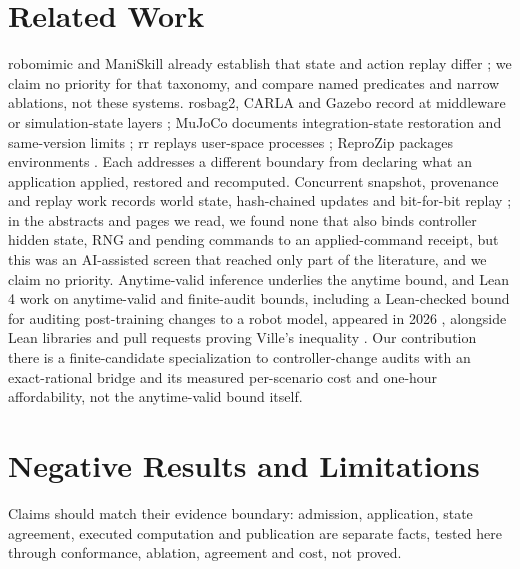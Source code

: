 \documentclass[letterpaper]{article}
\begin{document}
\section{Related Work}
robomimic and ManiSkill already establish that state and action replay differ \citep{robomimicplayback,maniskillreplay,
mandlekar2022robomimic,tao2025maniskill3,geng2025roboverse}; we claim no priority for that taxonomy, and compare named predicates and
narrow ablations, not these systems. rosbag2, CARLA and Gazebo record at middleware or simulation-state layers
\citep{rosbag2,carlarecorder,gazebologging}; MuJoCo documents integration-state restoration and same-version limits
\citep{mujococomputation}; rr replays user-space processes \citep{ocallahan2017rr}; ReproZip packages environments
\citep{chirigati2013reprozip}. Each addresses a different boundary from declaring what an application applied, restored
and recomputed. Concurrent snapshot, provenance and replay work records world state, hash-chained updates and bit-for-bit replay
\citep{li2026tws,zhou2026simuguard}; in the abstracts and pages we read, we found none that also binds controller hidden state, RNG and pending commands to
an applied-command receipt, but this was an AI-assisted screen that reached only part of the literature, and we claim no priority. Anytime-valid inference
\citep{ville1939etude,howard2021timeuniform} underlies the anytime bound, and Lean 4 work on anytime-valid and finite-audit bounds, including a Lean-checked bound for auditing
post-training changes to a robot model, appeared in 2026
\citep{gupta2026pacbayes,sneiderman2026monitor,sneiderman2026simulated,sneiderman2026fixedn,yang2026formalavs,mittal2026sealed},
alongside Lean libraries and pull requests proving Ville's inequality \citep{lmlexploreville,formalmartingales,atlaslean1250,mathlib45429}.
Our contribution there is a finite-candidate specialization to controller-change audits with an exact-rational bridge and
its measured per-scenario cost and one-hour affordability, not the anytime-valid bound itself.

\section{Negative Results and Limitations}
Claims should match their evidence boundary: admission, application, state agreement, executed computation and
publication are separate facts, tested here through conformance, ablation, agreement and cost, not proved.
\end{document}
